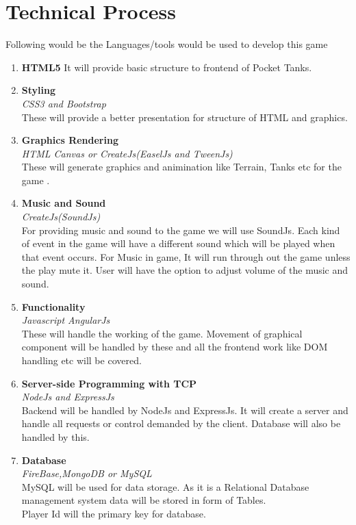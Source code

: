 \documentclass[12pt]{extarticle}
\begin{document}
\section{Technical Process}
Following would be the Languages/tools would be used to develop this game
\begin{enumerate}
\item \textbf{HTML5}
	It will provide basic structure to frontend of Pocket Tanks.
\item \textbf{Styling} 
\\	\textit{CSS3 and Bootstrap}
\\
	These will provide a better presentation for structure of HTML and graphics.
\item \textbf{Graphics Rendering}
\\	\textit{HTML Canvas or CreateJs(EaselJs and TweenJs)}
\\	These will generate graphics and animination like Terrain, Tanks etc for the game .
\item \textbf{Music and Sound}
\\	\textit{CreateJs(SoundJs)}
\\	For providing music and sound to the game we will use SoundJs. Each kind of event in the game will have a different sound which will be played when that event occurs. For Music in game, It will run through out the game unless the play mute it.
	User will have the option to adjust volume of the music and sound.
\item \textbf{Functionality}
\\	\textit{Javascript AngularJs}
\\	These will handle the working of the game. Movement of graphical component will be handled by these and all the frontend work like DOM handling etc will be covered.
\item \textbf{Server-side Programming with TCP}
\\	\textit{NodeJs and ExpressJs}
\\	Backend will be handled by NodeJs and ExpressJs. It will create a server and handle all requests or control demanded by the client. Database will also be handled by this.
\item \textbf{Database}
\\	\textit{FireBase,MongoDB or MySQL}
\\	MySQL will be used for data storage. As it is a Relational Database management system data will be stored in form of Tables.
	\\Player Id will the primary key for database.

\end{enumerate}
\end{document}
